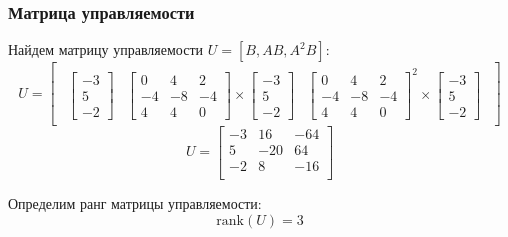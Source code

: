\subsubsection{Матрица управляемости}
Найдем матрицу управляемости $U = [B, AB, A^2B]$: 
\begin{equation}
    U = \begin{bmatrix} 
        \begin{array}{c|c|c}
            \begin{bmatrix}
                -3 \\
                5 \\
                -2
            \end{bmatrix} & 
            \begin{bmatrix}
                0 & 4 & 2 \\
                -4 & -8 & -4 \\
                4 & 4 & 0
            \end{bmatrix} \times 
            \begin{bmatrix}
                -3 \\
                5 \\
                -2
            \end{bmatrix} &
            \begin{bmatrix}
                0 & 4 & 2 \\
                -4 & -8 & -4 \\
                4 & 4 & 0
            \end{bmatrix}^2 \times
            \begin{bmatrix}
                -3 \\
                5 \\
                -2
            \end{bmatrix}
        \end{array}   
    \end{bmatrix}
\end{equation}
\begin{equation}
    U = \begin{bmatrix}
        -3 & 16 & -64 \\
        5 & -20 & 64 \\
        -2 & 8 & -16 \\
    \end{bmatrix}
\end{equation}

Определим ранг матрицы управляемости:
\begin{equation}
    \text{rank}(U) = 3
\end{equation}

